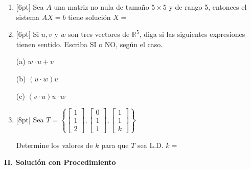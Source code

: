 \documentclass[11pt]{article}
\begin{document}
\begin{enumerate}
\item{}[6pt] Sea $A$ una matriz no nula de tamaño $5\times 5$ y de rango 5, entonces el sistema $AX=b$ tiene solución $X=$ \dotfill

\item{}[6pt] Si $u, v$ y $w$ son tres vectores de $\mathbb{R}^5$, diga si las siguientes expresiones tienen sentido. Escriba SI o NO, según el caso.

\vspace{6pt}
\noindent (a) $w\cdot u+v$ \dotfill

\vspace{6pt}
\noindent (b) $(u\cdot w)v$ \dotfill

\vspace{6pt}
\noindent (c) $(v\cdot u)u\cdot w$ \dotfill

\item{}[8pt] Sea $T = \left\{\begin{bmatrix}1\\1\\2\end{bmatrix},\begin{bmatrix}0\\1\\1\end{bmatrix},\begin{bmatrix}1\\1\\k\end{bmatrix}\right\}$

\vspace{4pt}
\noindent Determine los valores de $k$ para que $T$ sea L.D. $k=$ \dotfill
\end{enumerate}

\vspace{6pt}
\begin{center}\textbf{II. Solución con Procedimiento}\end{center}
\end{document}
